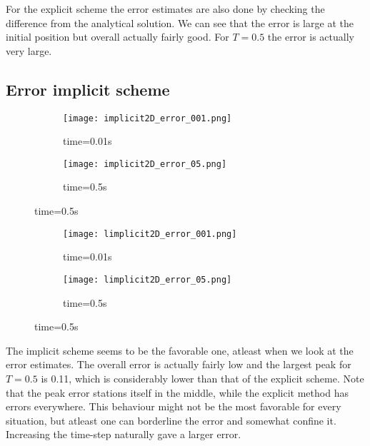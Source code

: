 \documentclass[a4paper,11pt]{article}
\begin{document}
    For the explicit scheme the error estimates are also done by checking the difference from the analytical solution. We can see that the error is large at the initial position but overall actually fairly good. For $T=0.5$ the error is actually very large.

\subsection{Error implicit scheme}
    \begin{figure}[H]
        \caption{Error implicit scheme $\Delta t=0.00005$}
        \captionsetup[subfigure]{labelformat=empty}
        \begin{subfigure}[b!]{0.55\textwidth}
            \texttt{[image: implicit2D\_error\_001.png]}
            \caption{time=0.01s}
        \end{subfigure}
        \begin{subfigure}[b!]{0.55\textwidth}
            \texttt{[image: implicit2D\_error\_05.png]}
            \caption{time=0.5s}
        \end{subfigure}
    \end{figure}
    \begin{figure}[H]
        \caption{Error implicit scheme $\Delta t=0.0005$}
        \captionsetup[subfigure]{labelformat=empty}
        \begin{subfigure}[b!]{0.55\textwidth}
            \texttt{[image: limplicit2D\_error\_001.png]}
            \caption{time=0.01s}
        \end{subfigure}
        \begin{subfigure}[b!]{0.55\textwidth}
            \texttt{[image: limplicit2D\_error\_05.png]}
            \caption{time=0.5s}
        \end{subfigure}
    \end{figure} \justify

    The implicit scheme seems to be the favorable one, atleast when we look at the error estimates. The overall error is actually fairly low and the largest peak for $T=0.5$ is 0.11, which is considerably lower than that of the explicit scheme. Note that the peak error stations itself in the middle, while the explicit method has errors everywhere. This behaviour might not be the most favorable for every situation, but atleast one can borderline the error and somewhat confine it. Increasing the time-step naturally gave a larger error.
\end{document}
